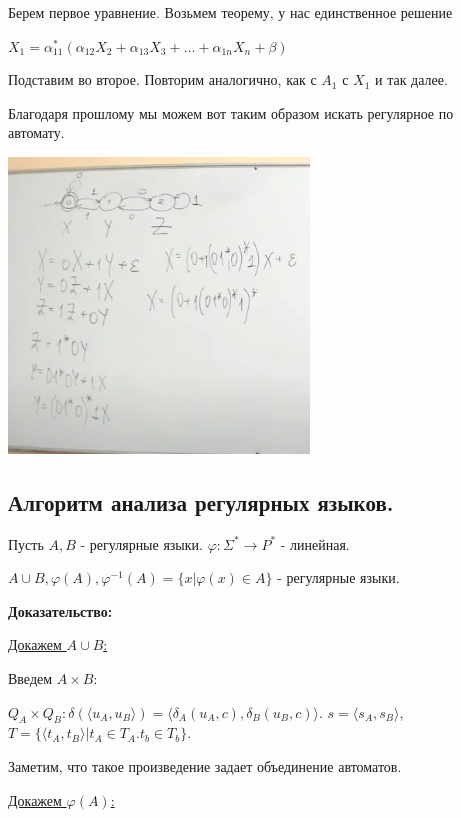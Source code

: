 Берем первое уравнение. Возьмем теорему, у нас единственное решение

$X_1 = \alpha_{11}^* (\alpha_{12}X_2 + \alpha_{13}X_3 + \ldots + \alpha_{1n}X_n  +\beta)$

Подставим во второе. Повторим аналогично, как с $A_1$ с $X_1$ и так далее.

Благодаря прошлому мы можем вот таким образом искать регулярное по автомату.

\begin{center}
    \includegraphics[width = 8cm]{assets/10_2_1.jpg}
\end{center}

\subsection{Алгоритм анализа регулярных языков.}


Пусть $A,B$ - регулярные языки. $\varphi: \Sigma^* \rightarrow P^*$ - линейная.

$A \cup B,\varphi(A), \varphi^{-1}(A) = \{x|\varphi(x)\in A\}$ - регулярные языки.

\textbf{Доказательство:}

\uline{Докажем $A \cup B$:}

Введем  $A \times B$: 

$Q_A \times Q_B: \delta(\langle u_A,u_B\rangle) = \langle \delta_A(u_A,c), \delta_B(u_B,c) \rangle$. $s = \langle s_A, s_B\rangle$, $T = \{\langle t_A,t_B\rangle| t_A \in T_A. t_b \in T_b\}$. 

Заметим, что такое произведение задает объединение автоматов.

\uline{Докажем $\varphi(A)$:}

